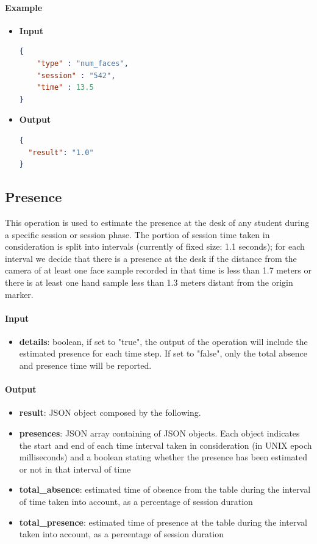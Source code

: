 \documentclass[a4paper,notitlepage,onecolumn]{hitec}  %
\begin{document}
\paragraph{Example}
\begin{itemize}
\item\textbf{Input}
\begin{lstlisting}[language=json,firstnumber=1]
{
    "type" : "num_faces",
    "session" : "542",
    "time" : 13.5
}
\end{lstlisting}
\item\textbf{Output}
\begin{lstlisting}[language=json,firstnumber=1]
{
  "result": "1.0"
}
\end{lstlisting}
\end{itemize}

\subsection{Presence}
This operation is used to estimate the presence at the desk of any student during a specific session or session phase. The portion of session time taken in consideration is split into intervals (currently of fixed size: 1.1 seconds); for each interval we decide that there is a presence at the desk if the distance from the camera of at least one face sample recorded in that time is less than 1.7 meters or there is at least one hand sample less than 1.3 meters distant from the origin marker.
\paragraph{Input}
\begin{itemize}
\item\textbf{details}: boolean, if set to "true", the output of the operation will include the estimated presence for each time step. If set to "false", only the total absence and presence time will be reported.
\end{itemize}

\paragraph{Output}
\begin{itemize}
\item\textbf{result}: JSON object composed by the following.
\item\textbf{presences}: JSON array containing of JSON objects. Each object indicates the start and end of each time interval taken in consideration (in UNIX epoch milliseconds) and a boolean stating whether the presence has been estimated or not in that interval of time  
\item\textbf{total\_absence}: estimated time of obsence from the table during the interval of time taken into account, as a percentage of session duration
\item\textbf{total\_presence}: estimated time of presence at the table during the interval taken into account, as a percentage of session duration
\end{itemize}
\end{document}

